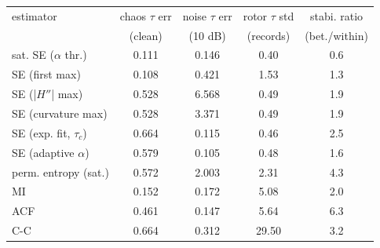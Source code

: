 \begin{tabular}{lcccc}
\toprule
estimator & chaos $\tau$ err & noise $\tau$ err & rotor $\tau$ std & stabi. ratio \\
 & (clean) & (10 dB) & (records) & (bet./within) \\
\midrule
sat. SE ($\alpha$ thr.) & 0.111 & 0.146 & 0.40 & 0.6 \\
SE (first max) & 0.108 & 0.421 & 1.53 & 1.3 \\
SE (|$H''$| max) & 0.528 & 6.568 & 0.49 & 1.9 \\
SE (curvature max) & 0.528 & 3.371 & 0.49 & 1.9 \\
SE (exp. fit, $\tau_c$) & 0.664 & 0.115 & 0.46 & 2.5 \\
SE (adaptive $\alpha$) & 0.579 & 0.105 & 0.48 & 1.6 \\
perm. entropy (sat.) & 0.572 & 2.003 & 2.31 & 4.3 \\
MI & 0.152 & 0.172 & 5.08 & 2.0 \\
ACF & 0.461 & 0.147 & 5.64 & 6.3 \\
C-C & 0.664 & 0.312 & 29.50 & 3.2 \\
\bottomrule
\end{tabular}
